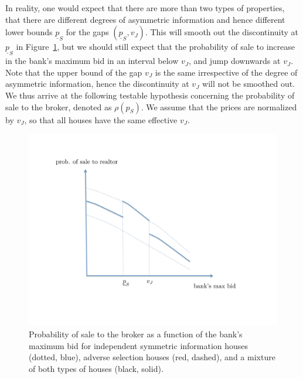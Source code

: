 \documentclass[11pt,twopage]{article}
\newcommand{\ul}{\underline}
\begin{document}
In reality, one would expect that there are more than two
types of properties, that there are different degrees of asymmetric information and hence different lower bounds $\ul p_S$ for the gaps $(\ul p_S,v_J)$. This will smooth out the discontinuity at $\ul p_S$ in
Figure~\ref{fig:theory-probability-of-sale}, but we should still
expect that the probability of sale to increase in the bank's
maximum bid in an interval below $v_J$, and jump downwards at $v_J$. Note that the upper bound of the gap $v_J$ is the same irrespective of the degree of asymmetric information, hence the discontinuity at $v_J$ will not be smoothed out.
We thus arrive at the following testable hypothesis concerning the probability of sale to the broker, denoted as $\rho(p_S)$. We assume that the prices are normalized by $v_J$, so that all houses have the same effective $v_J$.
\begin{figure} %
\centering
\includegraphics[scale = 0.5]{graphics/prob_of_sale}
\caption{Probability of sale to the broker as a function of the bank's
  maximum bid for independent symmetric information houses
  (dotted, blue), adverse selection houses (red, dashed), and a
  mixture of both types of houses (black, solid).}
\label{fig:theory-probability-of-sale}
\end{figure}
\end{document}
